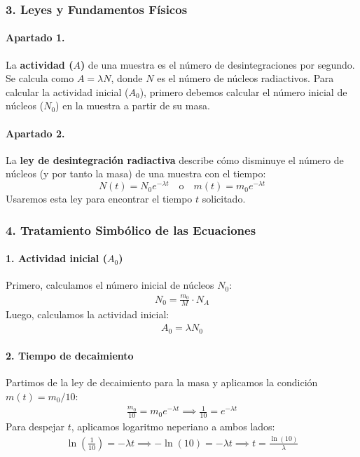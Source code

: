 \subsubsection*{3. Leyes y Fundamentos Físicos}
\paragraph{Apartado 1.} La \textbf{actividad ($A$)} de una muestra es el número de desintegraciones por segundo. Se calcula como $A = \lambda N$, donde $N$ es el número de núcleos radiactivos. Para calcular la actividad inicial ($A_0$), primero debemos calcular el número inicial de núcleos ($N_0$) en la muestra a partir de su masa.

\paragraph{Apartado 2.} La \textbf{ley de desintegración radiactiva} describe cómo disminuye el número de núcleos (y por tanto la masa) de una muestra con el tiempo:
$$ N(t) = N_0 e^{-\lambda t} \quad \text{o} \quad m(t) = m_0 e^{-\lambda t} $$
Usaremos esta ley para encontrar el tiempo $t$ solicitado.

\subsubsection*{4. Tratamiento Simbólico de las Ecuaciones}
\paragraph{1. Actividad inicial ($A_0$)}
Primero, calculamos el número inicial de núcleos $N_0$:
\begin{gather}
    N_0 = \frac{m_0}{M} \cdot N_A
\end{gather}
Luego, calculamos la actividad inicial:
\begin{gather}
    A_0 = \lambda N_0
\end{gather}

\paragraph{2. Tiempo de decaimiento}
Partimos de la ley de decaimiento para la masa y aplicamos la condición $m(t) = m_0/10$:
\begin{gather}
    \frac{m_0}{10} = m_0 e^{-\lambda t} \implies \frac{1}{10} = e^{-\lambda t}
\end{gather}
Para despejar $t$, aplicamos logaritmo neperiano a ambos lados:
\begin{gather}
    \ln\left(\frac{1}{10}\right) = -\lambda t \implies -\ln(10) = -\lambda t \implies t = \frac{\ln(10)}{\lambda}
\end{gather}

